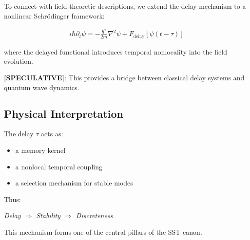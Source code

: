         To connect with field-theoretic descriptions, we extend the delay mechanism to a nonlinear Schrödinger framework:
        
        \begin{align}
            i \hbar \partial_t \psi = -\frac{\hbar^2}{2m} \nabla^2 \psi + F_{\text{delay}}[\psi(t - \tau)]
        \end{align}
        
        where the delayed functional introduces temporal nonlocality into the field evolution.
        
        \textbf{[SPECULATIVE]}: This provides a bridge between classical delay systems and quantum wave dynamics.
    
    \subsection{Physical Interpretation}
        
        The delay $\tau$ acts as:
        
        \begin{itemize}
            \item a memory kernel
            \item a nonlocal temporal coupling
            \item a selection mechanism for stable modes
        \end{itemize}
        
        Thus:
        
        \begin{center}
            \textit{Delay $\Rightarrow$ Stability $\Rightarrow$ Discreteness}
        \end{center}
        
        This mechanism forms one of the central pillars of the SST canon.